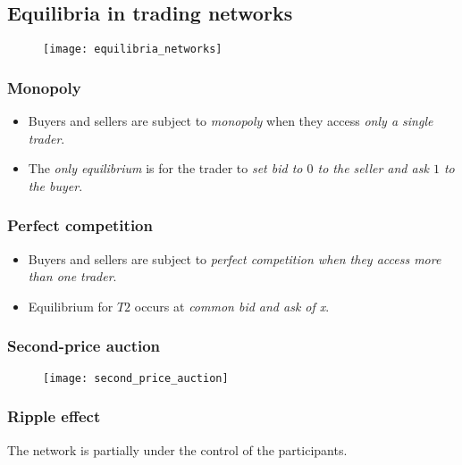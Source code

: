 \subsection{Equilibria in trading networks}

\begin{figure}[H]
    \centering
    \texttt{[image: equilibria\_networks]}
\end{figure}

\subsubsection{Monopoly}

\begin{itemize}
\item Buyers and sellers are subject to \textit{monopoly} when they access \textit{only a single trader}.
\item The \textit{only equilibrium} is for the trader to \textit{set bid to $0$ to the seller and ask $1$ to the buyer}.
\end{itemize}

\subsubsection{Perfect competition}

\begin{itemize}
\item Buyers and sellers are subject to \textit{perfect competition when they access more than one trader}.
\item Equilibrium for $T2$ occurs at \textit{common bid and ask of x}.
\end{itemize}

\subsubsection{Second-price auction}

\begin{figure}[H]
    \centering
    \texttt{[image: second\_price\_auction]}
\end{figure}

\subsubsection{Ripple effect}

The network is partially under the control of the participants.

